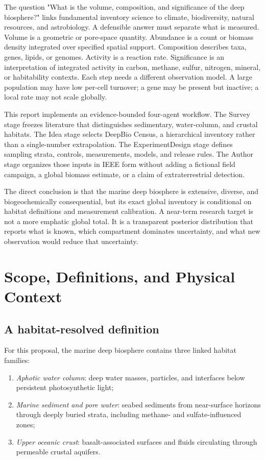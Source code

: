 \documentclass[conference]{../../../../Conference-LaTeX-template_10-17-19/IEEEtran}
\begin{document}
The question "What is the volume, composition, and significance of the deep biosphere?" links fundamental inventory science to climate, biodiversity, natural resources, and astrobiology. A defensible answer must separate what is measured. Volume is a geometric or pore-space quantity. Abundance is a count or biomass density integrated over specified spatial support. Composition describes taxa, genes, lipids, or genomes. Activity is a reaction rate. Significance is an interpretation of integrated activity in carbon, methane, sulfur, nitrogen, mineral, or habitability contexts. Each step needs a different observation model. A large population may have low per-cell turnover; a gene may be present but inactive; a local rate may not scale globally.

This report implements an evidence-bounded four-agent workflow. The Survey stage freezes literature that distinguishes sedimentary, water-column, and crustal habitats. The Idea stage selects DeepBio Census, a hierarchical inventory rather than a single-number extrapolation. The ExperimentDesign stage defines sampling strata, controls, measurements, models, and release rules. The Author stage organizes those inputs in IEEE form without adding a fictional field campaign, a global biomass estimate, or a claim of extraterrestrial detection.

The direct conclusion is that the marine deep biosphere is extensive, diverse, and biogeochemically consequential, but its exact global inventory is conditional on habitat definitions and measurement calibration. A near-term research target is not a more emphatic global total. It is a transparent posterior distribution that reports what is known, which compartment dominates uncertainty, and what new observation would reduce that uncertainty.

\section{Scope, Definitions, and Physical Context}
\subsection{A habitat-resolved definition}
For this proposal, the marine deep biosphere contains three linked habitat families:
\begin{enumerate}
\item \textit{Aphotic water column}: deep water masses, particles, and interfaces below persistent photosynthetic light;
\item \textit{Marine sediment and pore water}: seabed sediments from near-surface horizons through deeply buried strata, including methane- and sulfate-influenced zones;
\item \textit{Upper oceanic crust}: basalt-associated surfaces and fluids circulating through permeable crustal aquifers.
\end{enumerate}
\end{document}

